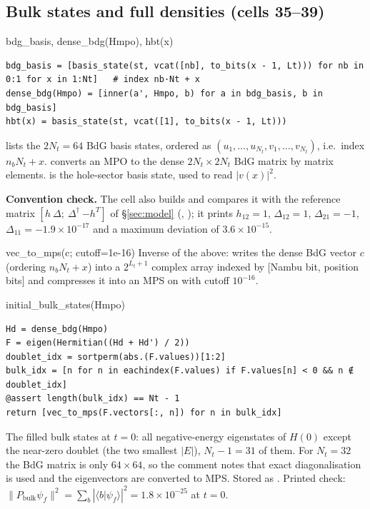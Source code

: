\documentclass[11pt]{article}
\begin{document}
\subsection{Bulk states and full densities (cells 35--39)}

\begin{function}{bdg\_basis, dense\_bdg(Hmpo), hbt(x)}
\begin{Verbatim}
bdg_basis = [basis_state(st, vcat([nb], to_bits(x - 1, Lt))) for nb in 0:1 for x in 1:Nt]   # index nb·Nt + x
dense_bdg(Hmpo) = [inner(a', Hmpo, b) for a in bdg_basis, b in bdg_basis]
hbt(x) = basis_state(st, vcat([1], to_bits(x - 1, Lt)))
\end{Verbatim}
 lists the $2N_t=64$ BdG basis states, ordered as $(u_1,\dots,u_{N_t},v_1,\dots,v_{N_t})$, i.e.\
index $n_b N_t + x$.  converts an MPO to the dense $2N_t\times2N_t$ BdG matrix by matrix elements.
\code{hbt(x)} is the hole-sector basis state, used to read $|v(x)|^2$.

\textbf{Convention check.} The cell also builds  and compares it with the
reference matrix $[h\ \Delta;\ \Delta^\dagger\ {-h^T}]$ of \S\ref{sec:model} (\code{h\_ref}, \code{Δ\_ref}); it prints
$h_{12}=1$, $\Delta_{12}=1$, $\Delta_{21}=-1$, $\Delta_{11}=-1.9\times10^{-17}$ and a maximum deviation of $3.6\times10^{-15}$.
\end{function}

\begin{function}{vec\_to\_mps(c; cutoff=1e-16)}
Inverse of the above: writes the dense BdG vector $c$ (ordering $n_bN_t+x$) into a $2^{L_t+1}$ complex array indexed
by [Nambu bit, position bits] and compresses it into an MPS on \code{st} with cutoff $10^{-16}$.
\end{function}

\begin{function}{initial\_bulk\_states(Hmpo)}
\begin{Verbatim}
Hd = dense_bdg(Hmpo)
F = eigen(Hermitian((Hd + Hd') / 2))
doublet_idx = sortperm(abs.(F.values))[1:2]
bulk_idx = [n for n in eachindex(F.values) if F.values[n] < 0 && n ∉ doublet_idx]
@assert length(bulk_idx) == Nt - 1
return [vec_to_mps(F.vectors[:, n]) for n in bulk_idx]
\end{Verbatim}
The filled bulk states at $t=0$: all negative-energy eigenstates of $H(0)$ except the near-zero doublet (the two
smallest $|E|$), $N_t-1=31$ of them. For $N_t=32$ the BdG matrix is only $64\times64$, so the comment notes that exact
diagonalisation is used and the eigenvectors are converted to MPS. Stored as \code{bulk\_init}. Printed check:
$\lVert P_{\text{bulk}}\psi_f\rVert^2 = \sum_b|\langle b\vert\psi_f\rangle|^2 = 1.8\times10^{-25}$ at $t=0$.
\end{function}
\end{document}

